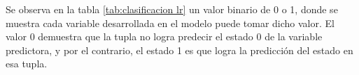 \begin{table}[H]
\centering
\setlength{\tabcolsep}{10pt}
\caption{Predicciones probabilísticas con clasificación final Logistic Regression}
\label{tab:clasificacion lr}
\end{table}
        
    Se observa en la tabla \ref{tab:clasificacion lr} un valor binario de 0 o 1, donde se muestra cada variable
desarrollada en el modelo puede tomar dicho valor. El valor 0 demuestra
que la tupla no logra predecir el estado 0 de la variable predictora, y
por el contrario, el estado 1 es que logra la predicción del estado en
esa tupla.

